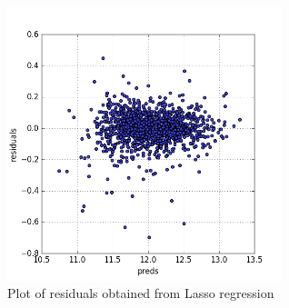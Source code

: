 \documentclass[a4paper, 11pt]{article}
\begin{document}
\begin{figure}[t]
\caption{Plot of residuals obtained from Lasso regression}
\includegraphics[width=8cm]{residuals.png}
\centering
\end{figure}
\end{document}
